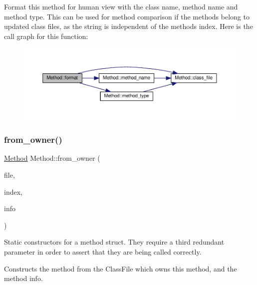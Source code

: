 Format this method for human view with the class name, method name and method type. This can be used for method comparison if the methods belong to updated class files, as the string is independent of the method\textquotesingle{}s index. Here is the call graph for this function\+:\nopagebreak
\begin{figure}[H]
\begin{center}
\leavevmode
\includegraphics[width=350pt]{classMethod_a3f6d55a368a1e2727bea0799c3cdc0f6_cgraph}
\end{center}
\end{figure}
\mbox{\label{classMethod_ad977afdb14569e1108c6b6849fe0b007}} 
\subsubsection{\texorpdfstring{from\+\_\+owner()}{from\_owner()}}
{\footnotesize\ttfamily \hyperlink{classMethod}{Method} Method\+::from\+\_\+owner (\begin{DoxyParamCaption}\item[{const \hyperlink{classfile_8h_a00b46b60bc40e813e9fb1bb049174346}{Class\+File} \&}]{file,  }\item[{int}]{index,  }\item[{\hyperlink{structmethod__info}{method\+\_\+info}}]{info }\end{DoxyParamCaption})\hspace{0.3cm}{\ttfamily [static]}}

Static constructors for a method struct. They require a third redundant parameter in order to assert that they are being called correctly.

Constructs the method from the Class\+File which owns this method, and the method info.

